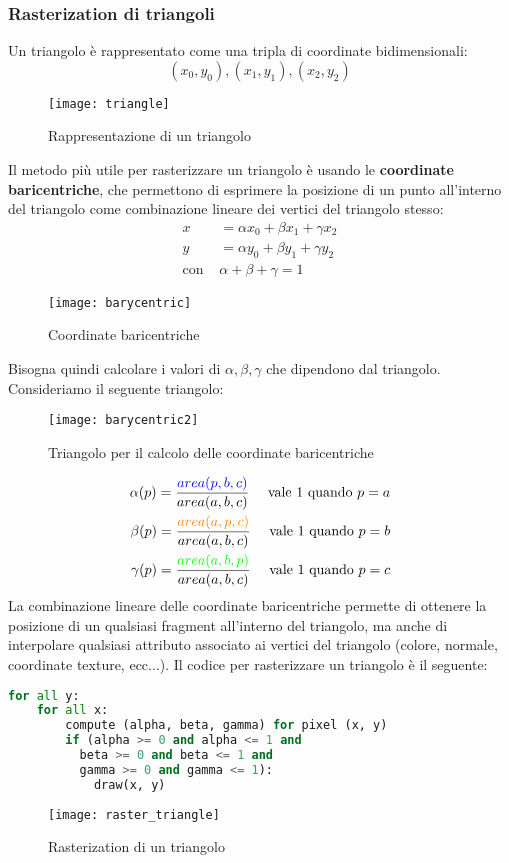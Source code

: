 \documentclass[a4paper]{article}
\begin{document}
\subsubsection{Rasterization di triangoli}
Un triangolo è rappresentato come una tripla di coordinate bidimensionali:
\[
  (x_0, y_0), (x_1, y_1), (x_2, y_2)
\] 
\begin{figure}[H]
  \centering
  \texttt{[image: triangle]}
  \caption{Rappresentazione di un triangolo}
\end{figure}
\noindent
Il metodo più utile per rasterizzare un triangolo è usando le
\textbf{coordinate baricentriche}, che permettono di esprimere la posizione di un punto
all'interno del triangolo come combinazione lineare dei vertici del triangolo stesso:
\[
  \begin{aligned}
    x &= \alpha x_0 + \beta x_1 + \gamma x_2 \\
    y &= \alpha y_0 + \beta y_1 + \gamma y_2 \\
    \text{con }& \alpha + \beta + \gamma = 1
  \end{aligned}
\] 
\begin{figure}[H]
  \centering
  \texttt{[image: barycentric]}
  \caption{Coordinate baricentriche}
\end{figure}
\noindent
Bisogna quindi calcolare i valori di \( \alpha, \beta, \gamma \) che dipendono dal
triangolo. Consideriamo il seguente triangolo:
\begin{figure}[H]
  \centering
  \texttt{[image: barycentric2]}
  \caption{Triangolo per il calcolo delle coordinate baricentriche}
\end{figure}
\[
  \begin{aligned}
    \alpha(p) = \frac{\color{blue}area(p, b, c)\color{black}}{area(a, b, c)}
    \quad \text{ vale 1 quando } p = a \\
    \beta(p) = \frac{\color{orange}area(a, p, c)\color{black}}{area(a, b, c)}
    \quad \text{ vale 1 quando } p = b \\
    \gamma(p) = \frac{\color{green}area(a, b, p)\color{black}}{area(a, b, c)}
    \quad \text{ vale 1 quando } p = c \\
  \end{aligned}
\] 
La combinazione lineare delle coordinate baricentriche permette di ottenere la posizione
di un qualsiasi fragment all'interno del triangolo, ma anche di interpolare qualsiasi
attributo associato ai vertici del triangolo (colore, normale, coordinate texture, ecc...).
Il codice per rasterizzare un triangolo è il seguente:
\begin{lstlisting}[language=Python]
for all y:
    for all x:
        compute (alpha, beta, gamma) for pixel (x, y)
        if (alpha >= 0 and alpha <= 1 and
          beta >= 0 and beta <= 1 and
          gamma >= 0 and gamma <= 1):
            draw(x, y)
\end{lstlisting}
\begin{figure}[H]
  \centering
  \texttt{[image: raster\_triangle]}
  \caption{Rasterization di un triangolo}
\end{figure}
\end{document}
